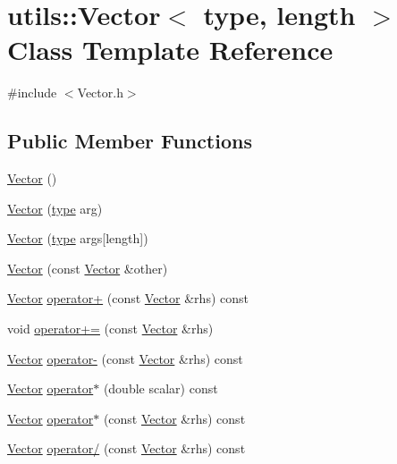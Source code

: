 \hypertarget{classutils_1_1Vector}{\section{utils\-:\-:Vector$<$ type, length $>$ Class Template Reference}
\label{classutils_1_1Vector}
}


{\ttfamily \#include $<$Vector.\-h$>$}

\subsection*{Public Member Functions}
\begin{DoxyCompactItemize}
\item 
\hyperlink{classutils_1_1Vector_a71b42b489a54eb7eae82cff54fae0e12}{Vector} ()
\item 
\hyperlink{classutils_1_1Vector_a5f7d3385f6db28e1376d16e46f1a485f}{Vector} (\hyperlink{classtype}{type} arg)
\item 
\hyperlink{classutils_1_1Vector_a61a6f07c23829b70273ab4578bbb2332}{Vector} (\hyperlink{classtype}{type} args\mbox{[}length\mbox{]})
\item 
\hyperlink{classutils_1_1Vector_abb684db142444c4b19e6cd854db1a0d8}{Vector} (const \hyperlink{classutils_1_1Vector}{Vector} \&other)
\item 
\hyperlink{classutils_1_1Vector}{Vector} \hyperlink{classutils_1_1Vector_aeb0edeaa6b74a48839892e16623b0949}{operator+} (const \hyperlink{classutils_1_1Vector}{Vector} \&rhs) const 
\item 
void \hyperlink{classutils_1_1Vector_a4d64ff224bc6721a4d195a604ee26468}{operator+=} (const \hyperlink{classutils_1_1Vector}{Vector} \&rhs)
\item 
\hyperlink{classutils_1_1Vector}{Vector} \hyperlink{classutils_1_1Vector_ad6e42a80810a58993f39e1d876eb5716}{operator-\/} (const \hyperlink{classutils_1_1Vector}{Vector} \&rhs) const 
\item 
\hyperlink{classutils_1_1Vector}{Vector} \hyperlink{classutils_1_1Vector_a655ed48c281bfb1c87901313eb1896bb}{operator$\ast$} (double scalar) const 
\item 
\hyperlink{classutils_1_1Vector}{Vector} \hyperlink{classutils_1_1Vector_acdeef6a50ab26e2135ba245d5c7c2b29}{operator$\ast$} (const \hyperlink{classutils_1_1Vector}{Vector} \&rhs) const 
\item 
\hyperlink{classutils_1_1Vector}{Vector} \hyperlink{classutils_1_1Vector_a93ec38bf43c7f738f5cd26f5edc1e27d}{operator/} (const \hyperlink{classutils_1_1Vector}{Vector} \&rhs) const 

\end{DoxyCompactItemize}
